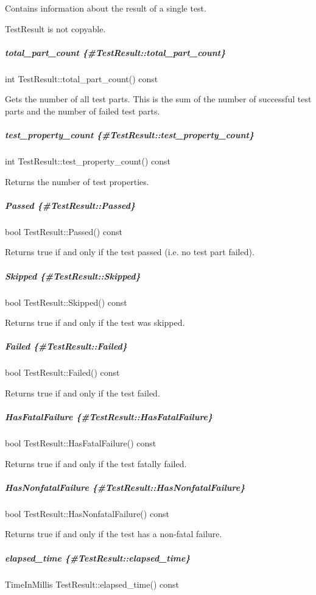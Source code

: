Contains information about the result of a single test.

{\ttfamily Test\+Result} is not copyable.

\subparagraph*{total\+\_\+part\+\_\+count \{\#\+Test\+Result\+::total\+\_\+part\+\_\+count\}}

{\ttfamily int Test\+Result\+::total\+\_\+part\+\_\+count() const}

Gets the number of all test parts. This is the sum of the number of successful test parts and the number of failed test parts.

\subparagraph*{test\+\_\+property\+\_\+count \{\#\+Test\+Result\+::test\+\_\+property\+\_\+count\}}

{\ttfamily int Test\+Result\+::test\+\_\+property\+\_\+count() const}

Returns the number of test properties.

\subparagraph*{Passed \{\#\+Test\+Result\+::\+Passed\}}

{\ttfamily bool Test\+Result\+::\+Passed() const}

Returns true if and only if the test passed (i.\+e. no test part failed).

\subparagraph*{Skipped \{\#\+Test\+Result\+::\+Skipped\}}

{\ttfamily bool Test\+Result\+::\+Skipped() const}

Returns true if and only if the test was skipped.

\subparagraph*{Failed \{\#\+Test\+Result\+::\+Failed\}}

{\ttfamily bool Test\+Result\+::\+Failed() const}

Returns true if and only if the test failed.

\subparagraph*{Has\+Fatal\+Failure \{\#\+Test\+Result\+::\+Has\+Fatal\+Failure\}}

{\ttfamily bool Test\+Result\+::\+Has\+Fatal\+Failure() const}

Returns true if and only if the test fatally failed.

\subparagraph*{Has\+Nonfatal\+Failure \{\#\+Test\+Result\+::\+Has\+Nonfatal\+Failure\}}

{\ttfamily bool Test\+Result\+::\+Has\+Nonfatal\+Failure() const}

Returns true if and only if the test has a non-\/fatal failure.

\subparagraph*{elapsed\+\_\+time \{\#\+Test\+Result\+::elapsed\+\_\+time\}}

{\ttfamily Time\+In\+Millis Test\+Result\+::elapsed\+\_\+time() const}

